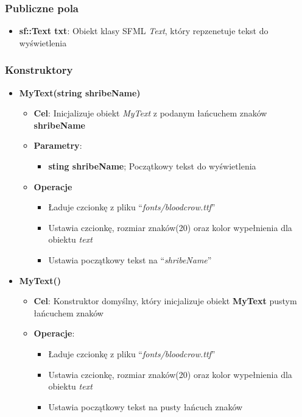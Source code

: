 \documentclass[a4paper, 10pt]{article}
\begin{document}
\subsubsection{Publiczne pola}
\begin{itemize}
	\item \textbf{sf::Text txt}: Obiekt klasy SFML \emph{Text}, który repzenetuje tekst do wyświetlenia
\end{itemize}
\subsubsection{Konstruktory}
\begin{itemize}
	\item \textbf{MyText(string shribeName)}
		\begin{itemize}
			\item \textbf{Cel}: Inicjalizuje obiekt \emph{MyText} z podanym łańcuchem znaków \textbf{shribeName}
			\item \textbf{Parametry}:
				\begin{itemize}
					\item \textbf{sting shribeName}; Początkowy tekst do wyświetlenia
				\end{itemize}
			\item \textbf{Operacje}
				\begin{itemize}
					\item Ładuje czcionkę z pliku ``\emph{fonts/bloodcrow.ttf}''
					\item Ustawia czcionkę, rozmiar znaków(20) oraz kolor wypełnienia dla obiektu \emph{text}
					\item Ustawia początkowy tekst na ``\emph{shribeName}''
				\end{itemize}
		\end{itemize}
	\item \textbf{MyText()}
		\begin{itemize}
			\item \textbf{Cel}: Konstruktor domyślny, który inicjalizuje obiekt \textbf{MyText} pustym łańcuchem znaków
			\item \textbf{Operacje}:
				\begin{itemize}
					\item Ładuje czcionkę z pliku ``\emph{fonts/bloodcrow.ttf}''
					\item Ustawia czcionkę, rozmiar znaków(20) oraz kolor wypełnienia dla obiektu \emph{text}
					\item Ustawia początkowy tekst na pusty łańcuch znaków
				\end{itemize}
		\end{itemize}
\end{itemize}
\end{document}
